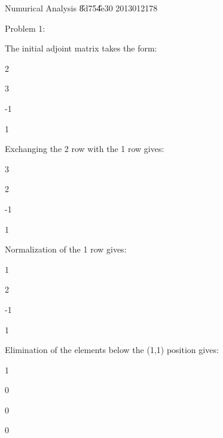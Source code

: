 \documentclass{article}
\begin{document}
\bigskip Numurical Analysis \U{8d75}\U{4e30} 2013012178

Problem 1:

The initial adjoint matrix takes the form:

2\qquad \TEXTsymbol{\vert}\qquad

3\qquad \TEXTsymbol{\vert}\qquad

-1\qquad \TEXTsymbol{\vert}\qquad

1\qquad \TEXTsymbol{\vert}\qquad

Exchanging the 2 row with the 1 row gives:

3\qquad \TEXTsymbol{\vert}\qquad

2\qquad \TEXTsymbol{\vert}\qquad

-1\qquad \TEXTsymbol{\vert}\qquad

1\qquad \TEXTsymbol{\vert}\qquad

Normalization of the 1 row gives:

1\qquad \TEXTsymbol{\vert}\qquad

2\qquad \TEXTsymbol{\vert}\qquad

-1\qquad \TEXTsymbol{\vert}\qquad

1\qquad \TEXTsymbol{\vert}\qquad

Elimination of the elements below the (1,1) position gives:

1\qquad \TEXTsymbol{\vert}\qquad

0\qquad \TEXTsymbol{\vert}\qquad

0\qquad \TEXTsymbol{\vert}\qquad

0\qquad \TEXTsymbol{\vert}\qquad
\end{document}
